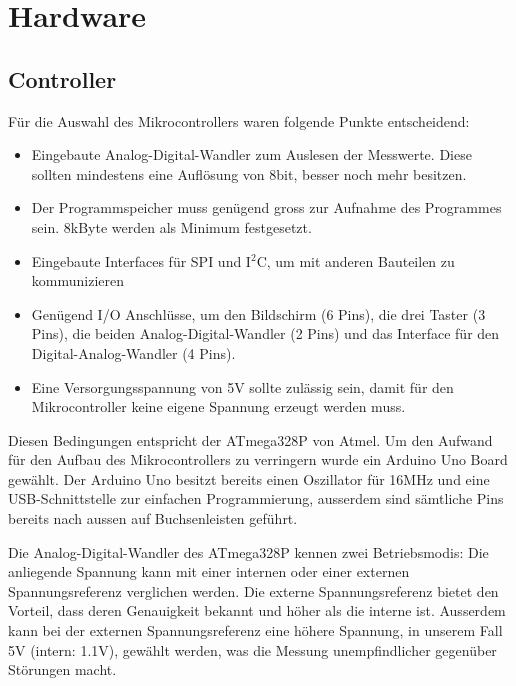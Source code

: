\section{Hardware}

\subsection{Controller}

Für die Auswahl des Mikrocontrollers waren folgende Punkte entscheidend:
\begin{itemize}
	\item Eingebaute Analog-Digital-Wandler zum Auslesen der Messwerte. Diese sollten mindestens eine Auflösung von 8bit, besser noch mehr besitzen.
	\item Der Programmspeicher muss genügend gross zur Aufnahme des Programmes sein. 8kByte werden als Minimum festgesetzt.
	\item Eingebaute Interfaces für SPI und I$^2$C, um mit anderen Bauteilen zu kommunizieren
	\item Genügend I/O Anschlüsse, um den Bildschirm (6 Pins), die drei Taster (3 Pins), die beiden Analog-Digital-Wandler (2 Pins) und das Interface für den Digital-Analog-Wandler (4 Pins).
	\item Eine Versorgungsspannung von 5V sollte zulässig sein, damit für den Mikrocontroller keine eigene Spannung erzeugt werden muss.
\end{itemize}

Diesen Bedingungen entspricht der ATmega328P von Atmel. Um den Aufwand für den Aufbau des Mikrocontrollers zu verringern wurde ein Arduino Uno Board gewählt. Der Arduino Uno besitzt bereits einen Oszillator für 16MHz und eine USB-Schnittstelle zur einfachen Programmierung, ausserdem sind sämtliche Pins bereits nach aussen auf Buchsenleisten geführt.

Die Analog-Digital-Wandler des ATmega328P kennen zwei Betriebsmodis: Die anliegende Spannung kann mit einer internen oder einer externen Spannungsreferenz verglichen werden. Die externe Spannungsreferenz bietet den Vorteil, dass deren Genauigkeit bekannt und höher als die interne ist. Ausserdem kann bei der externen Spannungsreferenz eine höhere Spannung, in unserem Fall 5V (intern: 1.1V), gewählt werden, was die Messung unempfindlicher gegenüber Störungen macht.
